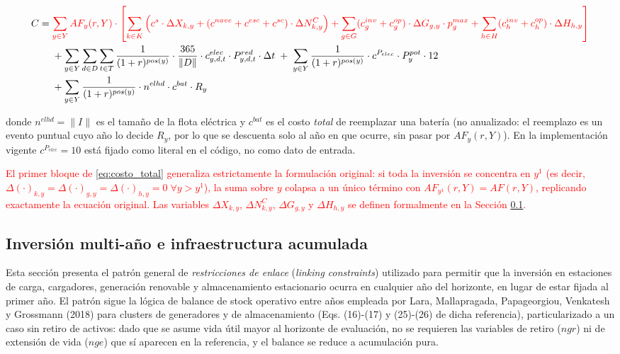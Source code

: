 \documentclass[11pt]{article}
\newcommand{\change}[1]{\textcolor{red}{#1}}
\begin{document}
\begin{equation}\label{eq:costo_total}
\begin{split}
C = \; & \change{\sum_{y \in Y} AF_y(r,Y) \cdot \left[ \sum_{k \in K} \Big(c^{s} \cdot \Delta X_{k,y} +( c^{nave} + c^{esc} +c^{sc}) \cdot \Delta N_{k,y}^C\Big) + \sum_{g \in G} (c^{inv}_g + c^{op}_g) \cdot \Delta G_{g,y} \cdot p^{max}_g + \sum_{h \in H} (c^{inv}_h + c^{op}_h)\cdot \Delta H_{h,y} \right]}  \\
& + \sum_{y \in Y} \sum_{d \in D} \sum_{t \in T} \frac{1}{(1+r)^{pos(y)}} \cdot \frac{365}{\| D \|} \cdot c^{elec}_{y,d,t} \cdot P^{red}_{y,d,t} \cdot \Delta t \; + \; \sum_{y \in Y} \frac{1}{(1+r)^{pos(y)}} \cdot c^{P_{elec}} \cdot P^{pot}_y \cdot 12 \\
& + \sum_{y \in Y} \frac{1}{(1+r)^{pos(y)}} \cdot n^{elhd} \cdot c^{bat} \cdot R_y
\end{split}
\end{equation}

\noindent donde $n^{elhd}=\|I\|$ es el tamaño de la flota eléctrica y $c^{bat}$ es el costo \emph{total} de reemplazar una batería (no anualizado: el reemplazo es un evento puntual cuyo año lo decide $R_y$, por lo que se descuenta solo al año en que ocurre, sin pasar por $AF_y(r,Y)$). En la implementación vigente $c^{P_{elec}}=10$ está fijado como literal en el código, no como dato de entrada.

\change{El primer bloque de \eqref{eq:costo_total} generaliza estrictamente la formulación original: si toda la inversión se concentra en $y^1$ (es decir, $\Delta(\cdot)_{k,y}=\Delta(\cdot)_{g,y}=\Delta(\cdot)_{h,y}=0\;\forall y>y^1$), la suma sobre $y$ colapsa a un único término con $AF_{y^1}(r,Y)=AF(r,Y)$, replicando exactamente la ecuación original. Las variables $\Delta X_{k,y}$, $\Delta N_{k,y}^C$, $\Delta G_{g,y}$ y $\Delta H_{h,y}$ se definen formalmente en la Sección \ref{sec:inversion_multianio}.}

\subsection{Inversión multi-año e infraestructura acumulada}
\label{sec:inversion_multianio}

\begingroup\color{red}
Esta sección presenta el patrón general de \emph{restricciones de enlace} (\textit{linking constraints}) utilizado para permitir que la inversión en estaciones de carga, cargadores, generación renovable y almacenamiento estacionario ocurra en cualquier año del horizonte, en lugar de estar fijada al primer año. El patrón sigue la lógica de balance de stock operativo entre años empleada por Lara, Mallapragada, Papageorgiou, Venkatesh y Grossmann (2018) para clusters de generadores y de almacenamiento (Eqs. (16)-(17) y (25)-(26) de dicha referencia), particularizado a un caso sin retiro de activos: dado que se asume vida útil mayor al horizonte de evaluación, no se requieren las variables de retiro ($ngr$) ni de extensión de vida ($nge$) que sí aparecen en la referencia, y el balance se reduce a acumulación pura.
\end{document}
